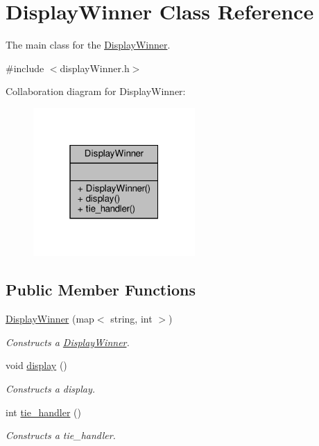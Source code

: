 \hypertarget{classDisplayWinner}{}\section{Display\+Winner Class Reference}
\label{classDisplayWinner}


The main class for the \hyperlink{classDisplayWinner}{Display\+Winner}.  




{\ttfamily \#include $<$display\+Winner.\+h$>$}



Collaboration diagram for Display\+Winner\+:\nopagebreak
\begin{figure}[H]
\begin{center}
\leavevmode
\includegraphics[width=175pt]{classDisplayWinner__coll__graph}
\end{center}
\end{figure}
\subsection*{Public Member Functions}
\begin{DoxyCompactItemize}
\item 
\hyperlink{classDisplayWinner_a88bd9a2c36dba7809acbc030ca628379}{Display\+Winner} (map$<$ string, int $>$)
\begin{DoxyCompactList}\small\item\em Constructs a \hyperlink{classDisplayWinner}{Display\+Winner}. \end{DoxyCompactList}\item 
void \hyperlink{classDisplayWinner_a20410b9011f23f62f8c6aa3b6fc830f3}{display} ()
\begin{DoxyCompactList}\small\item\em Constructs a display. \end{DoxyCompactList}\item 
int \hyperlink{classDisplayWinner_a59d69fff466af18ed00e925c22cbd616}{tie\+\_\+handler} ()
\begin{DoxyCompactList}\small\item\em Constructs a tie\+\_\+handler. \end{DoxyCompactList}\end{DoxyCompactItemize}


